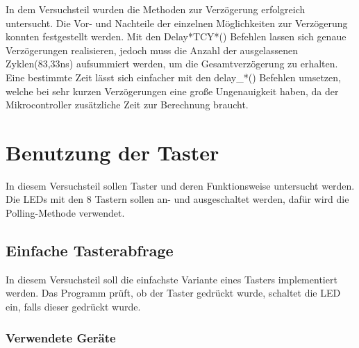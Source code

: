 \documentclass[12pt,a4paper]{article}
\begin{document}
In dem Versuchsteil wurden die Methoden zur Verzögerung erfolgreich untersucht. Die Vor- und Nachteile der einzelnen Möglichkeiten zur Verzögerung konnten festgestellt werden. Mit den Delay*TCY*() Befehlen lassen sich genaue Verzögerungen realisieren, jedoch muss die Anzahl der ausgelassenen Zyklen(83,33ns) aufsummiert werden, um die Gesamtverzögerung zu erhalten. Eine bestimmte Zeit lässt sich einfacher mit den delay\_*() Befehlen umsetzen, welche bei sehr kurzen Verzögerungen eine große Ungenauigkeit haben, da der Mikrocontroller zusätzliche Zeit zur Berechnung braucht.

\section{Benutzung der Taster}

In diesem Versuchsteil sollen Taster und deren Funktionsweise untersucht werden. Die LEDs mit den 8 Tastern sollen an- und ausgeschaltet werden, dafür wird die Polling-Methode verwendet.

\subsection{Einfache Tasterabfrage}

In diesem Versuchsteil soll die einfachste Variante eines Tasters implementiert werden. Das Programm prüft, ob der Taster gedrückt wurde, schaltet die LED ein, falls dieser gedrückt wurde.

\subsubsection*{Verwendete Geräte}
\end{document}

